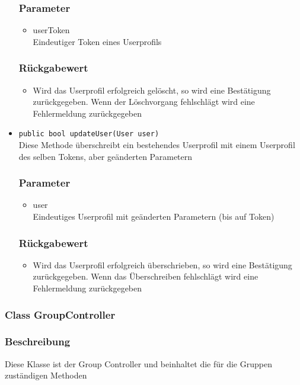 \documentclass[a4paper]{scrreprt}
\begin{document}
\begin{addmargin}[25pt]{0pt}
\begin{itemize}
	\subsubsection*{Parameter}
	\begin{itemize}
	\item userToken \\
		Eindeutiger Token eines Userprofils
	\end{itemize}
	\subsubsection*{Rückgabewert}
	\begin{itemize}
	\item Wird das Userprofil erfolgreich gelöscht, so wird eine Bestätigung zurückgegeben. Wenn der Löschvorgang fehlschlägt wird eine Fehlermeldung zurückgegeben
	\end{itemize}


\item \texttt{public bool updateUser(User user)}\\
	Diese Methode überschreibt ein bestehendes Userprofil mit einem Userprofil des selben Tokens, aber geänderten Parametern
	\subsubsection*{Parameter}
	\begin{itemize}
	\item user \\
		Eindeutiges Userprofil mit geänderten Parametern (bis auf Token)
	\end{itemize}
	\subsubsection*{Rückgabewert}
	\begin{itemize}
	\item Wird das Userprofil erfolgreich überschrieben, so wird eine Bestätigung zurückgegeben. Wenn das Überschreiben fehlschlägt wird eine Fehlermeldung zurückgegeben
	\end{itemize}
\end{itemize}

\end{addmargin}

\subsubsection{Class GroupController}
\subsubsection*{Beschreibung}
Diese Klasse ist der Group Controller und beinhaltet die für die Gruppen zuständigen Methoden
\end{document}
